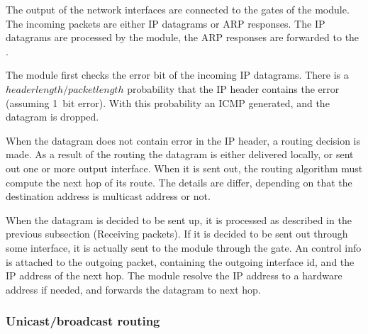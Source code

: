 The output of the network interfaces are connected to the
 gates of the  module. The incoming
packets are either IP datagrams or ARP responses. The IP datagrams
are processed by the  module, the ARP
responses are forwarded to the .

The  module first checks the error bit of the
incoming IP datagrams. There is a $header length/packet length$
probability that the IP header contains the error (assuming
1~bit error). With this probability an ICMP 
generated, and the datagram is dropped.


When the datagram does not contain error in the IP header,
a routing decision is made. As a result of the routing
the datagram is either delivered locally,
or sent out one or more output interface.
When it is sent out, the routing algorithm must compute the
next hop of its route. The details are differ, depending on
that the destination address is multicast address or not.

When the datagram is decided to be sent up, it is processed
as described in the previous subsection (Receiving packets).
If it is decided to be sent out through some interface, it
is actually sent to the  module through the
 gate. An  control
info is attached to the outgoing packet, containing the
outgoing interface id, and the IP address of the next hop.
The  module resolve the IP address to a hardware
address if needed, and forwards the datagram to next hop.

\subsubsection*{Unicast/broadcast routing}

